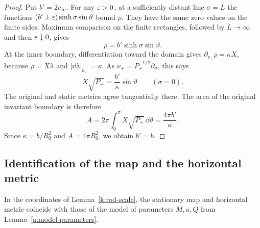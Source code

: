 \begin{proof}
Put \(b'=2c_\infty\). For any \(\varepsilon>0\), at a sufficiently distant
line \(\sigma=L\) the functions
\((b'\pm\varepsilon)\sinh\sigma\sin\vartheta\) bound \(\rho\).
They have the same zero values on the finite sides. Maximum
comparison on the finite rectangles, followed by \(L\to\infty\)
and then \(\varepsilon\downarrow0\), gives
\[
 \rho=b'\sinh\sigma\sin\vartheta .
\]
At the inner boundary, differentiation toward the domain gives
\(\partial_{\nu_+}\rho=\kappa X\), because
\(\rho=X\lambda\) and \(|\dd\lambda|_{h_+}=\kappa\).
As \(\nu_+=P_+^{-1/2}\partial_\sigma\), this says
\[
 X\sqrt{P_+}=\frac{b'}{\kappa}\sin\vartheta
                       \qquad(\sigma=0).
\]
The original and static metrics agree tangentially there.
The area of the original invariant boundary is therefore
\[
 A=2\pi\int_0^\pi X\sqrt{P_+}\,\dd\vartheta
     =\frac{4\pi b'}{\kappa}.
\]
Since \(\kappa=b/R_0^2\) and \(A=4\pi R_0^2\), we obtain \(b'=b\).
\end{proof}

\subsection{Identification of the map and the horizontal metric}

\begin{proposition}\label{k:identification}
In the coordinates of Lemma~\ref{k:rod-scale}, the stationary
map and horizontal metric coincide with those of the
\KN{} model of parameters \(M,a,Q\) from
Lemma~\ref{a:model-parameters}.
\end{proposition}

